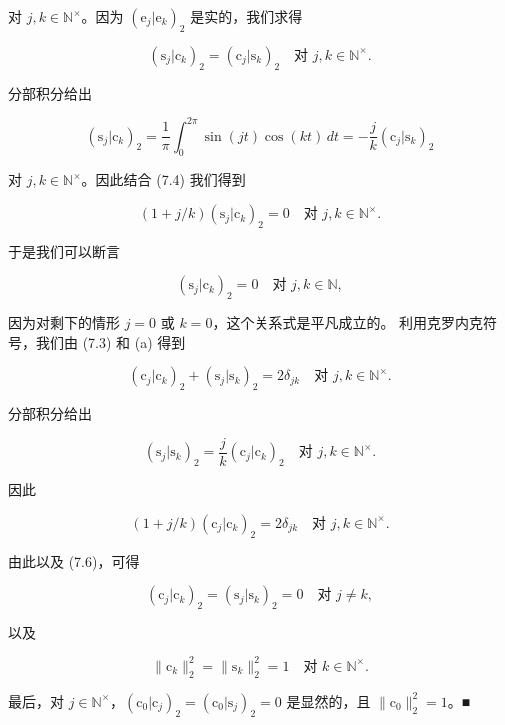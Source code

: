 \begin{example}
\begin{items}
对 $ j, k \in \mathbb{N}^{\times} $。因为 $ (\mathrm{e}_{j}|\mathrm{e}_{k})_{2} $ 是实的，我们求得

\begin{equation}
(\mathrm{s}_{j}|\mathrm{c}_{k})_{2} = (\mathrm{c}_{j}|\mathrm{s}_{k})_{2} \quad \text{对 } j, k \in \mathbb{N}^{\times} .\tag{7.4}
\end{equation}

分部积分给出

\[
(\mathrm{s}_{j}|\mathrm{c}_{k})_{2} = \frac{1}{\pi}\int_{0}^{2\pi} \sin(jt)\cos(kt) \, dt = -\frac{j}{k}(\mathrm{c}_{j}|\mathrm{s}_{k})_{2}
\]

对 $ j, k \in \mathbb{N}^{\times} $。因此结合 (7.4) 我们得到

\[
(1 + j/k)(\mathrm{s}_{j}|\mathrm{c}_{k})_{2} = 0 \quad \text{对 } j, k \in \mathbb{N}^{\times} .
\]

于是我们可以断言

\[
(\mathrm{s}_{j}|\mathrm{c}_{k})_{2} = 0 \quad \text{对 } j, k \in \mathbb{N} ,
\]

因为对剩下的情形 $ j = 0 $ 或 $ k = 0 $，这个关系式是平凡成立的。
利用克罗内克符号，我们由 (7.3) 和 (a) 得到

\begin{equation}
(\mathrm{c}_{j}|\mathrm{c}_{k})_{2} + (\mathrm{s}_{j}|\mathrm{s}_{k})_{2} = 2\delta_{jk} \quad \text{对 } j, k \in \mathbb{N}^{\times} .\tag{7.5}
\end{equation}

分部积分给出

\begin{equation}
(\mathrm{s}_{j}|\mathrm{s}_{k})_{2} = \frac{j}{k}(\mathrm{c}_{j}|\mathrm{c}_{k})_{2} \quad \text{对 } j, k \in \mathbb{N}^{\times} .\tag{7.6}
\end{equation}

因此

\[
(1 + j/k)(\mathrm{c}_{j}|\mathrm{c}_{k})_{2} = 2\delta_{jk} \quad \text{对 } j, k \in \mathbb{N}^{\times} .
\]

由此以及 (7.6)，可得

\[
(\mathrm{c}_{j}|\mathrm{c}_{k})_{2} = (\mathrm{s}_{j}|\mathrm{s}_{k})_{2} = 0 \quad \text{对 } j \ne k ,
\]

以及

\[
\|\mathrm{c}_{k}\|_{2}^{2} = \|\mathrm{s}_{k}\|_{2}^{2} = 1 \quad \text{对 } k \in \mathbb{N}^{\times} .
\]

最后，对 $ j \in \mathbb{N}^{\times} $，$ (\mathrm{c}_{0}|\mathrm{c}_{j})_{2} = (\mathrm{c}_{0}|\mathrm{s}_{j})_{2} = 0 $ 是显然的，且 $ \|\mathrm{c}_{0}\|_{2}^{2} = 1 $。\nobreak\hspace{0.35em}■

\end{items}

\end{example}

